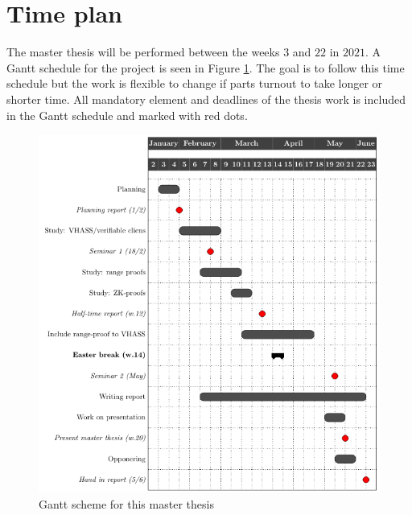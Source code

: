 \documentclass[12pt,a4paper]{article}
\begin{document}
\section{Time plan}
The master thesis will be performed between the weeks $3$ and $22$ in $2021$. A Gantt schedule for the project is seen in Figure \ref{fig:Gantt}. The goal is to follow this time schedule but the work is flexible to change if parts turnout to take longer or shorter time. All mandatory element and deadlines of the thesis work is included in the Gantt schedule and marked with red dots. 
\begin{figure}[]
\centering
    \includegraphics[width=1.1\linewidth]{gantt.png}
    \caption{Gantt scheme for this master thesis}
    \label{fig:Gantt}
\end{figure}
\newpage




\end{document}
